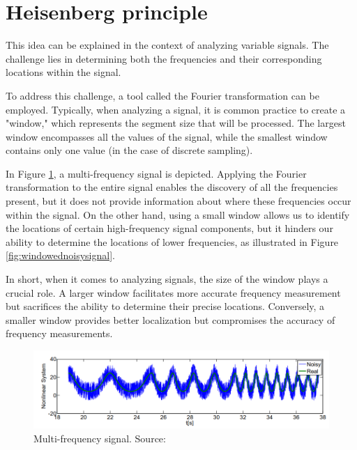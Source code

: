 	\section{Heisenberg principle}
	
		\par This idea can be explained in the context of analyzing variable signals. The challenge lies in determining both the frequencies and their corresponding locations within the signal.\newline
		
		\par To address this challenge, a tool called the Fourier transformation can be employed. Typically, when analyzing a signal, it is common practice to create a "window," which represents the segment size that will be processed. The largest window encompasses all the values of the signal, while the smallest window contains only one value (in the case of discrete sampling).\newline
		
		\par In Figure \ref{fig:noisysignal}, a multi-frequency signal is depicted. Applying the Fourier transformation to the entire signal enables the discovery of all the frequencies present, but it does not provide information about where these frequencies occur within the signal. On the other hand, using a small window allows us to identify the locations of certain high-frequency signal components, but it hinders our ability to determine the locations of lower frequencies, as illustrated in Figure \ref{fig:windowednoisysignal}.\newline
		
		\par In short, when it comes to analyzing signals, the size of the window plays a crucial role. A larger window facilitates more accurate frequency measurement but sacrifices the ability to determine their precise locations. Conversely, a smaller window provides better localization but compromises the accuracy of frequency measurements.

	
		\begin{figure}[h]
			\centering
			\includegraphics[width=1\linewidth]{images/noisySignal}
			\caption[Multi-frequency signal]{Multi-frequency signal. Source: \cite{olama2011design}}
			\label{fig:noisysignal}
		\end{figure}
		
